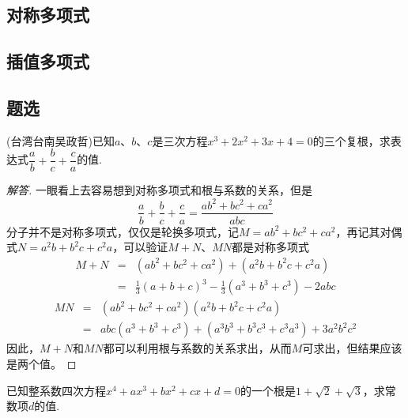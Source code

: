 \subsection{对称多项式}
\label{sec:symmetrical-polynome}



\subsection{插值多项式}
\label{sec:interpolation-polynome}

\subsection{题选}
\label{sec:exercises-for-polynome}


\begin{exercise}
  (台湾台南吴政哲)已知$a$、$b$、$c$是三次方程$x^3+2x^2+3x+4=0$的三个复根，求表达式$\dfrac{a}{b}+\dfrac{b}{c}+\dfrac{c}{a}$的值.
\end{exercise}

\begin{proof}[解答]
  一眼看上去容易想到对称多项式和根与系数的关系，但是
  \[ \frac{a}{b}+\frac{b}{c}+\frac{c}{a} = \frac{ab^2+bc^2+ca^2}{abc} \]
  分子并不是对称多项式，仅仅是轮换多项式，记$M=ab^2+bc^2+ca^2$，再记其对偶式$N=a^2b+b^2c+c^2a$，可以验证$M+N$、$MN$都是对称多项式
  \begin{eqnarray*}
    M+N & = & (ab^2+bc^2+ca^2) + (a^2b+b^2c+c^2a) \\
    & = & \frac{1}{3}(a+b+c)^3-\frac{1}{3}(a^3+b^3+c^3)-2abc
  \end{eqnarray*}
  \begin{eqnarray*}
    MN & = &(ab^2+bc^2+ca^2)(a^2b+b^2c+c^2a) \\
    & = & abc(a^3+b^3+c^3)+(a^3b^3+b^3c^3+c^3a^3)+3a^2b^2c^2
  \end{eqnarray*}
  因此，$M+N$和$MN$都可以利用根与系数的关系求出，从而$M$可求出，但结果应该是两个值。
\end{proof}

\begin{exercise}
  已知整系数四次方程$x^4+ax^3+bx^2+cx+d=0$的一个根是$1+\sqrt{2}+\sqrt{3}$，求常数项$d$的值.
\end{exercise}

